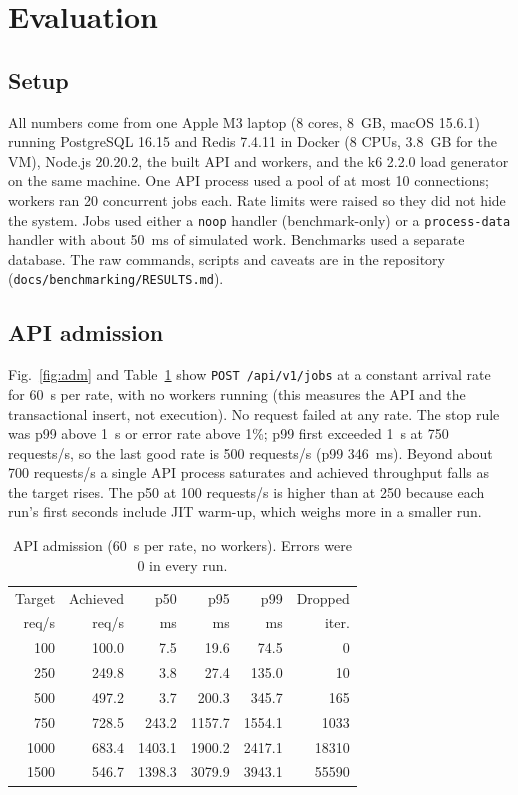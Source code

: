 \documentclass[conference]{IEEEtran}
\newcommand{\code}[1]{\texttt{\small #1}}
\begin{document}
\section{Evaluation}
\label{sec:eval}
\subsection{Setup}
All numbers come from one Apple M3 laptop (8 cores, 8~GB, macOS 15.6.1) running PostgreSQL 16.15 and Redis 7.4.11 in Docker (8 CPUs, 3.8~GB for the VM), Node.js 20.20.2, the built API and workers, and the k6 2.2.0 load generator on the same machine. One API process used a pool of at most 10 connections; workers ran 20 concurrent jobs each. Rate limits were raised so they did not hide the system. Jobs used either a \code{noop} handler (benchmark-only) or a \code{process-data} handler with about 50~ms of simulated work. Benchmarks used a separate database. The raw commands, scripts and caveats are in the repository (\code{docs/benchmarking/RESULTS.md}).

\subsection{API admission}
Fig.~\ref{fig:adm} and Table~\ref{tab:adm} show \code{POST /api/v1/jobs} at a constant arrival rate for 60~s per rate, with no workers running (this measures the API and the transactional insert, not execution). No request failed at any rate. The stop rule was p99 above 1~s or error rate above 1\%; p99 first exceeded 1~s at 750 requests/s, so the last good rate is 500 requests/s (p99 346~ms). Beyond about 700 requests/s a single API process saturates and achieved throughput falls as the target rises. The p50 at 100 requests/s is higher than at 250 because each run's first seconds include JIT warm-up, which weighs more in a smaller run.

\begin{table}[t]
\caption{API admission (60~s per rate, no workers). Errors were 0 in every run.}
\label{tab:adm}
\centering
\small
\begin{tabular}{rrrrrr}
\toprule
Target & Achieved & p50 & p95 & p99 & Dropped \\
req/s & req/s & ms & ms & ms & iter. \\
\midrule
100 & 100.0 & 7.5 & 19.6 & 74.5 & 0 \\
250 & 249.8 & 3.8 & 27.4 & 135.0 & 10 \\
500 & 497.2 & 3.7 & 200.3 & 345.7 & 165 \\
750 & 728.5 & 243.2 & 1157.7 & 1554.1 & 1033 \\
1000 & 683.4 & 1403.1 & 1900.2 & 2417.1 & 18310 \\
1500 & 546.7 & 1398.3 & 3079.9 & 3943.1 & 55590 \\
\bottomrule
\end{tabular}
\end{table}
\end{document}
